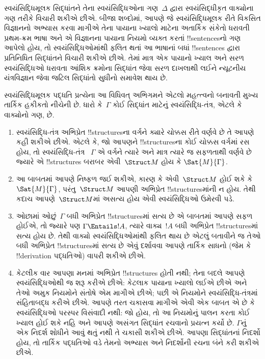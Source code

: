 \documentclass[../../../include/open-logic-section]{subfiles}
\begin{document}
\begin{explain}
સ્વયંસિદ્ધિમૂલક સિદ્ધાંતને તેના સ્વયંસિદ્ધિઓના ગણ~$\Delta$ દ્વારા
સ્વયંસિદ્ધીકૃત વાક્યોના ગણ તરીકે વિચારી શકીએ છીએ. બીજા શબ્દોમાં,
આપણે જે સ્વયંસિદ્ધિમૂલક રીતે વિકસિત વિજ્ઞાનનો અભ્યાસ કરવા માગીએ તેના
પાયાના ખ્યાલો માટેના અતાર્કિક સંકેતો ધરાવતી પ્રથમ-ક્રમ ભાષા અને એ
વિજ્ઞાનના પાયાના નિયમો વ્યક્ત કરતાં !!{sentence}sનો ગણ આપેલો હોય, તો
સ્વયંસિદ્ધિઓમાંથી ફલિત થતાં આ ભાષાનાં બધાં !!{sentence}s દ્વારા
પ્રતિનિધિત સિદ્ધાંતને વિચારી શકીએ છીએ. તેમાં માત્ર એક પાયાનો ખ્યાલ અને
સરળ સ્વયંસિદ્ધિઓ ધરાવતા આંશિક ક્રમોના સિદ્ધાંત જેવા સરળ દાખલાથી લઈને
ન્યૂટનીય યંત્રવિજ્ઞાન જેવા જટિલ સિદ્ધાંતો સુધીનો સમાવેશ થાય છે.

સ્વયંસિદ્ધિમૂલક પદ્ધતિ પ્રત્યેના આ વિધિવત્ અભિગમને એટલો મહત્ત્વનો
બનાવતી મુખ્ય તાર્કિક હકીકતો નીચેની છે. ધારો કે~$\Gamma$ કોઈ સિદ્ધાંત
માટેનું સ્વયંસિદ્ધિ-તંત્ર, એટલે કે વાક્યોનો ગણ, છે.
\begin{enumerate}
\item સ્વયંસિદ્ધિ-તંત્ર અભિપ્રેત !!{structure}sના વર્ગને ક્યારે ચોક્કસ
  રીતે વર્ણવે છે તે આપણે કહી શકીએ છીએ. એટલે કે, જો આપણને
  !!{structure}sના કોઈ ચોક્કસ વર્ગમાં રસ હોય, તો સ્વયંસિદ્ધિ-તંત્ર
  ~$\Gamma$ એ વર્ગને ત્યારે અને માત્ર ત્યારે જ સફળતાથી વર્ણવે છે જ્યારે
  એ !!{structure}s બરાબર એવી~$\Struct M$ હોય કે $\Sat{M}{\Gamma}$.
\item આ બાબતમાં આપણે નિષ્ફળ જઈ શકીએ, કારણ કે એવી~$\Struct M$ હોઈ શકે
  કે $\Sat{M}{\Gamma}$, પરંતુ~$\Struct M$ આપણી અભિપ્રેત
  !!{structure}sમાંની ન હોય. તેથી કદાચ આપણે~$\Struct M$માં અસત્ય હોય
  એવી સ્વયંસિદ્ધિઓ ઉમેરવી પડે.
\item ઓછામાં ઓછું~$\Gamma$ બધી અભિપ્રેત !!{structure}sમાં સત્ય છે એ
  બાબતમાં આપણે સફળ હોઈએ, તો જ્યારે પણ $\Gamma \Entails !A$, ત્યારે
  વાક્ય~$!A$ બધી અભિપ્રેત !!{structure}sમાં સત્ય હોય છે. તેથી વાક્યો
  સ્વયંસિદ્ધિઓમાંથી ફલિત થાય છે એટલું બતાવીને જ તેઓ બધી અભિપ્રેત
  !!{structure}sમાં સત્ય છે એવું દર્શાવવા આપણે તાર્કિક સાધનો (જેમ કે
  !!{derivation} પદ્ધતિઓ) વાપરી શકીએ છીએ.
\item કેટલીક વાર આપણા મનમાં અભિપ્રેત !!{structure}s હોતી નથી; તેના
  બદલે આપણે સ્વયંસિદ્ધિઓથી જ શરૂ કરીએ છીએ: કેટલાક પાયાના ખ્યાલો લઈએ
  છીએ અને તેઓ અમુક નિયમોને સંતોષે એમ માગીએ છીએ; પછી એ નિયમોને
  સ્વયંસિદ્ધિ-તંત્રમાં સંહિતાબદ્ધ કરીએ છીએ. આપણે તરત ચકાસવા માગીએ એવી
  એક બાબત એ છે કે સ્વયંસિદ્ધિઓ પરસ્પર વિસંવાદી નથી: જો હોય, તો આ
  નિયમોનું પાલન કરતા કોઈ ખ્યાલ હોઈ શકે નહિ અને આપણે અસંગત સિદ્ધાંત
  રચવાનો પ્રયત્ન કર્યો છે. $\Gamma$નું એક નિદર્શ શોધીને આવું થતું નથી
  તે ચકાસી શકીએ છીએ. આપણા સિદ્ધાંતનાં નિદર્શો હોય, તો તાર્કિક પદ્ધતિઓ
  વડે તેમનો અભ્યાસ અને નિદર્શોની રચના બંને કરી શકીએ છીએ.

\end{enumerate}
\end{explain}
\end{document}
